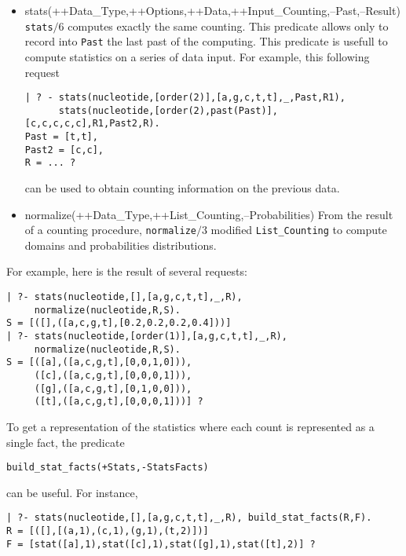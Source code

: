 \documentclass{book}
\begin{document}
\begin{itemize}
\begin{verbatim}
     ([c,a],[(a,0),(c,0),(g,0),(t,0)]),
     ([c,c],[(a,0),(c,3),(g,0),(t,1)]),
     ([c,g],[(a,0),(c,1),(g,0),(t,0)]),
     ([c,t],[(a,0),(c,0),(g,0),(t,1)]),
     ([g,a],[(a,0),(c,0),(g,0),(t,0)]),
     ([g,c],[(a,0),(c,0),(g,0),(t,1)]),
     ([g,g],[(a,0),(c,1),(g,0),(t,0)]),
     ([g,t],[(a,0),(c,0),(g,0),(t,1)]),
     ([t,a],[(a,0),(c,0),(g,0),(t,0)]),
     ([t,c],[(a,0),(c,0),(g,0),(t,1)]),
     ([t,g],[(a,0),(c,0),(g,0),(t,0)]),
     ([t,t],[(a,0),(c,1),(g,0),(t,0)]),
     ]?
\end{verbatim}
\item stats(++Data\_Type,++Options,++Data,++Input\_Counting,--Past,--Result)
\texttt{stats$\slash 6$} computes exactly the same counting. This predicate allows only to record
into \texttt{Past} the last past of the computing. This predicate is usefull to compute 
statistics on a series of data input. For example, this following request
\begin{verbatim}
| ? - stats(nucleotide,[order(2)],[a,g,c,t,t],_,Past,R1),
      stats(nucleotide,[order(2),past(Past)],[c,c,c,c,c],R1,Past2,R).
Past = [t,t],
Past2 = [c,c],
R = ... ?
\end{verbatim}     
can be used to obtain counting information on the previous data.
\item normalize(++Data\_Type,++List\_Counting,--Probabilities)
From the result of a counting procedure, \texttt{normalize$\slash 3$} modified \texttt{List\_Counting}
to compute domains and probabilities distributions. 
\end{itemize} 
For example, here is the result of several requests:
\begin{verbatim}
| ?- stats(nucleotide,[],[a,g,c,t,t],_,R),
     normalize(nucleotide,R,S).
S = [([],([a,c,g,t],[0.2,0.2,0.2,0.4]))]
| ?- stats(nucleotide,[order(1)],[a,g,c,t,t],_,R),
     normalize(nucleotide,R,S).
S = [([a],([a,c,g,t],[0,0,1,0])),
     ([c],([a,c,g,t],[0,0,0,1])),
     ([g],([a,c,g,t],[0,1,0,0])),
     ([t],([a,c,g,t],[0,0,0,1]))] ?
\end{verbatim}

To get a representation of the statistics where each count is represented
as a single fact, the predicate
\begin{verbatim}
build_stat_facts(+Stats,-StatsFacts)
\end{verbatim}
\noindent 
can be useful. For instance,
\begin{verbatim}
| ?- stats(nucleotide,[],[a,g,c,t,t],_,R), build_stat_facts(R,F).
R = [([],[(a,1),(c,1),(g,1),(t,2)])]
F = [stat([a],1),stat([c],1),stat([g],1),stat([t],2)] ?	
\end{verbatim}
\end{document}
